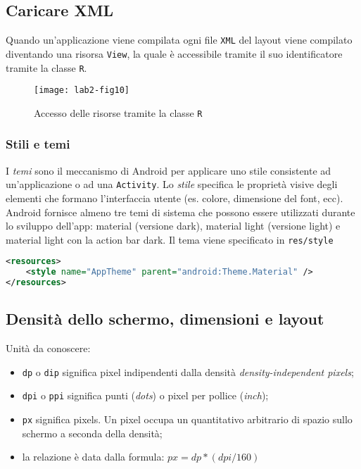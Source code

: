 \subsection{Caricare XML}

Quando un'applicazione viene compilata ogni file \texttt{XML} del layout viene
compilato diventando una risorsa \texttt{View}, la quale è accessibile tramite
il suo identificatore tramite la classe \texttt{R}.

\begin{figure*}[htbp]
        \centering
        \texttt{[image: lab2-fig10]}
        \caption[Accesso risorse R]{Accesso delle risorse tramite la classe
\texttt{R}}
        \label{img:lab2-fig10}
\end{figure*}

\subsubsection{Stili e temi}

I \textit{temi} sono il meccanismo di Android per applicare uno stile
consistente ad un'applicazione o ad una \texttt{Activity}. Lo \textit{stile}
specifica le proprietà visive degli elementi che formano l'interfaccia utente
(es. colore, dimensione del font, ecc).
Android fornisce almeno tre temi di sistema che possono essere utilizzati
durante lo sviluppo dell'app: material (versione dark), material light (versione
light) e material light con la action bar dark. Il tema viene specificato in
\texttt{res/style}

\begin{lstlisting}[language=XML]
<resources>
    <style name="AppTheme" parent="android:Theme.Material" />
</resources>
\end{lstlisting}

\subsection{Densità dello schermo, dimensioni e layout}

Unità da conoscere:
\begin{itemize}
\item \texttt{dp} o \texttt{dip} significa pixel indipendenti dalla densità
\textit{density-independent pixels};
\item \texttt{dpi} o \texttt{ppi} significa punti (\textit{dots}) o pixel per
pollice (\textit{inch});
\item \texttt{px} significa pixels. Un pixel occupa un quantitativo arbitrario di spazio
sullo schermo a seconda della densità;
\item la relazione è data dalla formula: $px = dp * (dpi/160)$
\end{itemize}

